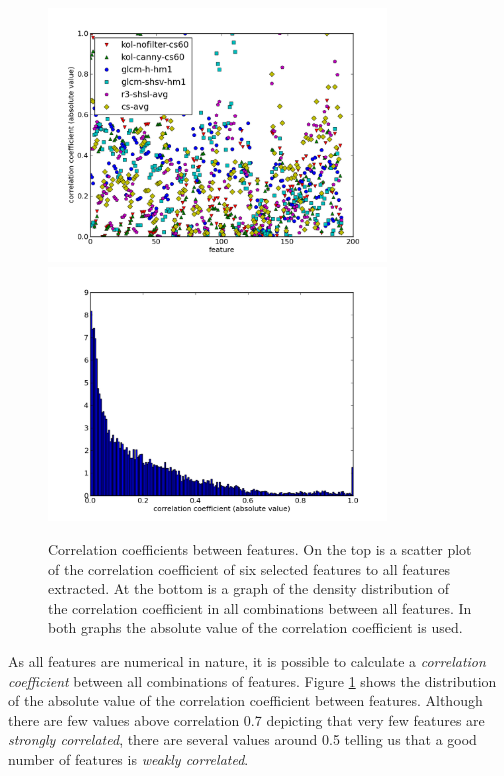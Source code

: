 \documentclass[11pt,a4paper,twoside,openright]{report}
\begin{document}
\begin{figure}[tbp]
\centering
\includegraphics[width=0.8\textwidth]{corr-graph}
\includegraphics[width=0.8\textwidth]{corr-dist}
\caption[Correlation]{Correlation coefficients between features.  On the top is
a scatter plot of the correlation coefficient of six selected features to all
features extracted.  At the bottom is a graph of the density distribution of
the correlation coefficient in all combinations between all features.  In both
graphs the absolute value of the correlation coefficient is used.}
\label{fig:corr}
\end{figure}

As all features are numerical in nature, it is possible to calculate a
\emph{correlation coefficient} between all combinations of features.  Figure
\ref{fig:corr} shows the distribution of the absolute value of the correlation
coefficient between features.  Although there are few values above correlation
0.7 depicting that very few features are \emph{strongly correlated}, there are
several values around 0.5 telling us that a good number of features is
\emph{weakly correlated}.
\end{document}
